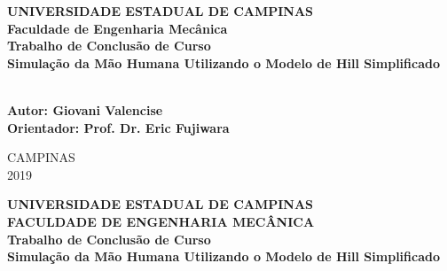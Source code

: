 \begin{center}
\vspace*{5cm}
{\fontsize{14}{14} \textbf{UNIVERSIDADE ESTADUAL DE CAMPINAS}}	\\ 
\vspace{0.6ex}
{\fontsize{14}{14} \textbf{Faculdade de Engenharia Mecânica}}	\\ 
\vspace{3cm}
{\fontsize{12}{12} \textbf{Trabalho de Conclusão de Curso}}	\\
\vspace{3cm}
{\fontsize{23}{23} \textbf{Simulação da Mão Humana Utilizando o Modelo de Hill Simplificado}}\\
\vspace{1.6ex}
{\fontsize{23}{23} \textbf{}}\\ 
\end{center}
\vspace{3cm}
\begin{flushright}
{\fontsize{12}{12} \textbf{Autor: Giovani Valencise}}\\ 
{\fontsize{12}{12} \textbf{Orientador: Prof. Dr. Eric Fujiwara}}\\
\end{flushright}
\vspace{2cm}
\begin{center}
CAMPINAS\\ 
2019
\end{center}


\clearpage
\thispagestyle{plain}



\begin{center}
\vspace*{0.8cm}

{\fontsize{14}{14} \textbf{UNIVERSIDADE ESTADUAL DE CAMPINAS}}	\\
{\fontsize{14}{14} \textbf{FACULDADE DE ENGENHARIA MECÂNICA}}	\\

\vspace{3cm}
{\fontsize{12}{12} \textbf{Trabalho de Conclusão de Curso}}	\\
\vspace{3cm}
{\fontsize{23}{23} \textbf{Simulação da Mão Humana Utilizando o Modelo de Hill Simplificado}}\\
\end{center}

